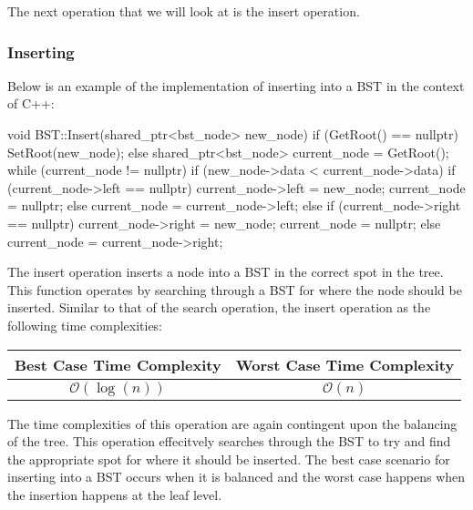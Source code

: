The next operation that we will look at is the insert operation.

\begin{highlight}

\subsubsection*{Inserting}

Below is an example of the implementation of inserting into a BST in the context of C++:

\begin{code}
void BST::Insert(shared_ptr<bst_node> new_node){
    if (GetRoot() == nullptr) {
        SetRoot(new_node);
    }
    else {
        shared_ptr<bst_node> current_node = GetRoot();
        while (current_node != nullptr) {
            if (new_node->data < current_node->data) {
                if (current_node->left == nullptr) {
                    current_node->left = new_node;
                    current_node = nullptr;
                }
                else {
                    current_node = current_node->left;
                }
            }
            else {
                if (current_node->right == nullptr) {
                    current_node->right = new_node;
                    current_node = nullptr;
                }
                else {
                    current_node = current_node->right;
                }
            }
        }
    }
}
\end{code}

The insert operation inserts a node into a BST in the correct spot in the tree. This function operates by searching through a BST for where the node should be inserted. Similar to that of the search
operation, the insert operation as the following time complexities: \newline

\begin{center}
    \begin{tabular}[ht]{|c|c|}
        \hline \textbf{Best Case Time Complexity} & \textbf{Worst Case Time Complexity} \\ \hline
        $\mathcal{O}(\log{(n)})$ & $\mathcal{O}(n)$ \\ \hline
    \end{tabular}
\end{center}

\noindent The time complexities of this operation are again contingent upon the balancing of the tree. This operation effecitvely searches through the BST to try and find the appropriate spot for where
it should be inserted. The best case scenario for inserting into a BST occurs when it is balanced and the worst case happens when the insertion happens at the leaf level.

\end{highlight}

